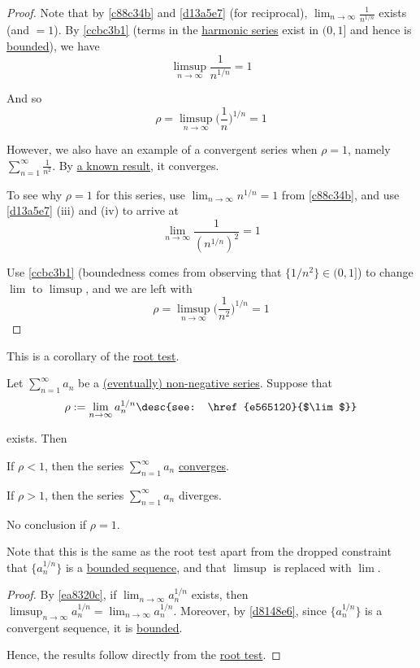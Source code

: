 \begin{proof}
  Note that by \autoref{c88c34b} and \autoref{d13a5e7} (for reciprocal),
  $\lim_{n\to\infty}\frac1{n^{1/n}}$ exists (and $=1$). By \autoref{ccbc3b1}
  (terms in the \href{c9bddda}{harmonic series} exist in $(0,1]$ and hence is
  \href{d5ed299}{bounded}), we have
  $$
    \limsup_{n\to\infty}\frac1{n^{1/n}}=1
  $$

  And so
  $$
    \rho=\limsup_{n\to\infty}\biggl(\frac1n\biggr)^{1/n}=1
  $$

  However, we also have an example of a convergent series when $\rho=1$, namely
  $\sum_{n=1}^\infty\frac1{n^2}$. By \href{e664113}{a known result}, it
  converges.

  To see why $\rho=1$ for this series, use $\lim_{n\to\infty}n^{1/n}=1$ from
  \autoref{c88c34b}, and use \autoref{d13a5e7} (iii) and (iv) to arrive at
  $$
    \lim_{n\to\infty}\frac1{(n^{1/n})^2}=1
  $$

  Use \autoref{ccbc3b1} (boundedness comes from observing that
  $\{1/n^2\}\in(0,1]$) to change $\lim$ to $\limsup$, and we are left with
  $$
    \rho=\limsup_{n\to\infty}\biggl(\frac1{n^2}\biggr)^{1/n}=1
  $$
\end{proof}

\label{bffec35}

This is a corollary of the \href{d2ba8bd}{root test}.

Let $\sum_{n=1}^\infty a_n$ be a \href{b6cffeb}{(eventually) non-negative
series}. Suppose that
$$
  \rho:=\lim_{n\to\infty}a^{1/n}_n\desc{see: \href{e565120}{$\lim$}}
$$

exists. Then
\begin{enumerati}
  \item If $\rho<1$, then the series $\sum_{n=1}^\infty a_n$
        \href{f8901df}{converges}.
  \item If $\rho>1$, then the series $\sum_{n=1}^\infty a_n$ diverges.
  \item No conclusion if $\rho=1$.
\end{enumerati}

Note that this is the same as the root test apart from the dropped constraint
that $\{a^{1/n}_n\}$ is a \href{d5ed299}{bounded sequence}, and that
\href{f4f2af4}{$\limsup$} is replaced with $\lim$.

\begin{proof}
  By \autoref{ea8320c}, if $\lim_{n\to\infty}a^{1/n}_n$ exists, then
  $\limsup_{n\to\infty}a^{1/n}_n=\lim_{n\to\infty}a^{1/n}_n$. Moreover, by
  \autoref{d8148e6}, since $\{a^{1/n}_n\}$ is a convergent sequence, it is
  \href{e4698be}{bounded}.

  Hence, the results follow directly from the \href{d2ba8bd}{root test}.
\end{proof}
